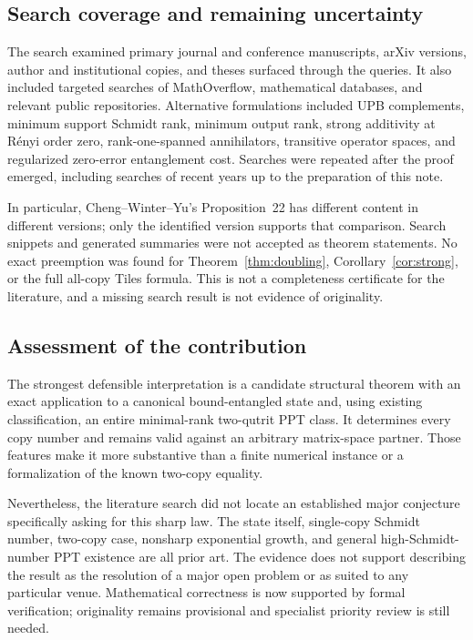 \documentclass[11pt]{article}
\theoremstyle{definition}
\begin{document}
\subsection{Search coverage and remaining uncertainty}

The search examined primary journal and conference manuscripts, arXiv
versions, author and institutional copies, and theses surfaced through the
queries. It also included targeted searches of MathOverflow, mathematical
databases, and relevant public repositories. Alternative formulations included UPB complements, minimum
support Schmidt rank, minimum output rank, strong additivity at R\'enyi
order zero, rank-one-spanned annihilators, transitive operator spaces, and
regularized zero-error entanglement cost. Searches were repeated after the
proof emerged, including searches of recent years up to the preparation of
this note.

In particular,
Cheng--Winter--Yu's Proposition~22 has different content in different
versions; only the identified version supports that comparison. Search
snippets and generated summaries were not accepted as theorem statements.
No exact preemption was found for Theorem~\ref{thm:doubling},
Corollary~\ref{cor:strong}, or the full all-copy Tiles formula. This is not
a completeness certificate for the literature, and a missing search result
is not evidence of originality.

\subsection{Assessment of the contribution}

The strongest defensible interpretation is a candidate structural theorem
with an exact application to a canonical bound-entangled state and, using
existing classification, an entire minimal-rank two-qutrit PPT class.
It determines every copy number and remains valid against an arbitrary
matrix-space partner. Those features make it more substantive than a finite
numerical instance or a formalization of the known two-copy equality.

Nevertheless, the literature search did not locate an established major conjecture
specifically asking for this sharp law. The state itself, single-copy
Schmidt number, two-copy case, nonsharp exponential growth, and general
high-Schmidt-number PPT existence are all prior art. The evidence does not
support describing the result as the resolution of a major open problem or
as suited to any particular venue. Mathematical correctness is now supported by
formal verification; originality remains provisional and specialist
priority review is still needed.
\end{document}
